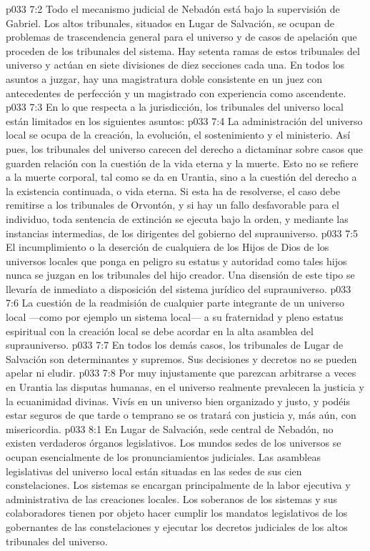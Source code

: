 \vs p033 7:2 Todo el mecanismo judicial de Nebadón está bajo la supervisión de Gabriel. Los altos tribunales, situados en Lugar de Salvación, se ocupan de problemas de trascendencia general para el universo y de casos de apelación que proceden de los tribunales del sistema. Hay setenta ramas de estos tribunales del universo y actúan en siete divisiones de diez secciones cada una. En todos los asuntos a juzgar, hay una magistratura doble consistente en un juez con antecedentes de perfección y un magistrado con experiencia como ascendente.
\vs p033 7:3 En lo que respecta a la jurisdicción, los tribunales del universo local están limitados en los siguientes asuntos:
\vs p033 7:4 La administración del universo local se ocupa de la creación, la evolución, el sostenimiento y el ministerio. Así pues, los tribunales del universo carecen del derecho a dictaminar sobre casos que guarden relación con la cuestión de la vida eterna y la muerte. Esto no se refiere a la muerte corporal, tal como se da en Urantia, sino a la cuestión del derecho a la existencia continuada, o vida eterna. Si esta ha de resolverse, el caso debe remitirse a los tribunales de Orvontón, y si hay un fallo desfavorable para el individuo, toda sentencia de extinción se ejecuta bajo la orden, y mediante las instancias intermedias, de los dirigentes del gobierno del suprauniverso.
\vs p033 7:5 El incumplimiento o la deserción de cualquiera de los Hijos de Dios de los universos locales que ponga en peligro su estatus y autoridad como tales hijos nunca se juzgan en los tribunales del hijo creador. Una disensión de este tipo se llevaría de inmediato a disposición del sistema jurídico del suprauniverso.
\vs p033 7:6 La cuestión de la readmisión de cualquier parte integrante de un universo local ---como por ejemplo un sistema local--- a su fraternidad y pleno estatus espiritual con la creación local se debe acordar en la alta asamblea del suprauniverso.
\vs p033 7:7 \pc En todos los demás casos, los tribunales de Lugar de Salvación son determinantes y supremos. Sus decisiones y decretos no se pueden apelar ni eludir.
\vs p033 7:8 Por muy injustamente que parezcan arbitrarse a veces en Urantia las disputas humanas, en el universo realmente prevalecen la justicia y la ecuanimidad divinas. Vivís en un universo bien organizado y justo, y podéis estar seguros de que tarde o temprano se os tratará con justicia y, más aún, con misericordia.
\vs p033 8:1 En Lugar de Salvación, sede central de Nebadón, no existen verdaderos órganos legislativos. Los mundos sedes de los universos se ocupan esencialmente de los pronunciamientos judiciales. Las asambleas legislativas del universo local están situadas en las sedes de sus cien constelaciones. Los sistemas se encargan principalmente de la labor ejecutiva y administrativa de las creaciones locales. Los soberanos de los sistemas y sus colaboradores tienen por objeto hacer cumplir los mandatos legislativos de los gobernantes de las constelaciones y ejecutar los decretos judiciales de los altos tribunales del universo.
